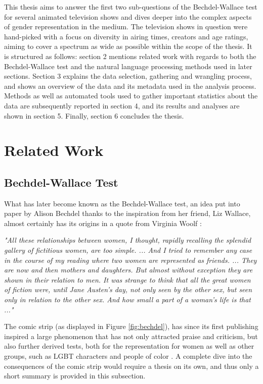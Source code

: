 \documentclass[a4paper, 11pt]{article}
\begin{document}
This thesis aims to answer the first two sub-questions of the Bechdel-Wallace test for several animated television shows and dives deeper into the complex aspects of gender representation in the medium. The television shows in question were hand-picked with a focus on diversity in airing times, creators and age ratings, aiming to cover a spectrum as wide as possible within the scope of the thesis. It is structured as follows: section 2 mentions related work with regards to both the Bechdel-Wallace test and the natural language processing methods used in later sections. Section 3 explains the data selection, gathering and wrangling process, and shows an overview of the data and its metadata used in the analysis process. Methods as well as automated tools used to gather important statistics about the data are subsequently reported in section 4, and its results and analyses are shown in section 5. Finally, section 6 concludes the thesis.

\section{Related Work}

\subsection{Bechdel-Wallace Test}
What has later become known as the Bechdel-Wallace test, an idea put into paper by Alison Bechdel thanks to the inspiration from her friend, Liz Wallace, almost certainly has its origins in a quote from Virginia Woolf \citep{testy}:

\begin{center}
\textit{"All these relationships between women, I thought, rapidly recalling the splendid gallery of fictitious women, are too simple. ... And I tried to remember any case in the course of my reading where two women are represented as friends. ... They are now and then mothers and daughters. But almost without exception they are shown in their relation to men. It was strange to think that all the great women of fiction were, until Jane Austen's day, not only seen by the other sex, but seen only in relation to the other sex. And how small a part of a woman's life is that ..."} \citep{woolf}
\end{center}

The comic strip (as displayed in Figure \ref{fig:bechdel}), has since its first publishing inspired a large phenomenon that has not only attracted praise and criticism, but also further derived tests, both for the representation for women as well as other groups, such as LGBT characters \citep{glaad} and people of color \citep{zeisler}. A complete dive into the consequences of the comic strip would require a thesis on its own, and thus only a short summary is provided in this subsection.
\end{document}
